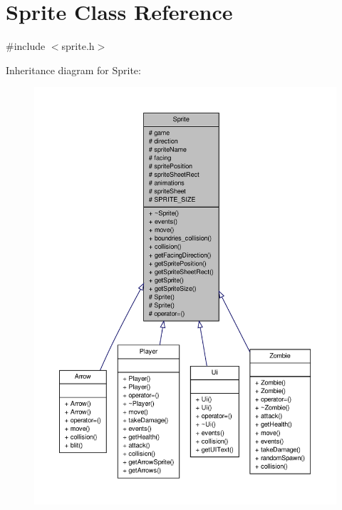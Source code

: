 \hypertarget{classSprite}{\section{Sprite Class Reference}
\label{classSprite}
}


{\ttfamily \#include $<$sprite.\-h$>$}



Inheritance diagram for Sprite\-:\nopagebreak
\begin{figure}[H]
\begin{center}
\leavevmode
\includegraphics[width=350pt]{classSprite__inherit__graph}
\end{center}
\end{figure}


